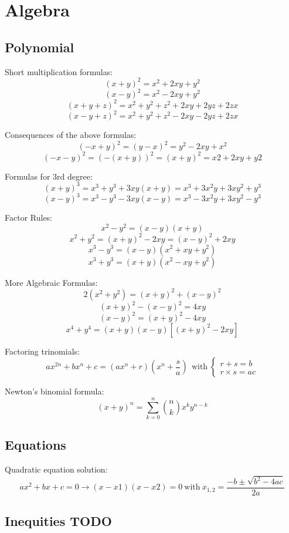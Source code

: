 \chapter{Algebra}

\section{Polynomial}
Short multiplication formulas:
$$(x + y)^2 = x^2 + 2xy + y^2$$
$$(x - y)^2 = x^2 - 2xy + y^2$$ 
$$(x + y + z)^2 = x^2 + y^2 + z^2 + 2xy + 2yz + 2zx$$ 
$$(x - y + z)^2 = x^2 + y^2 + z^2 - 2xy - 2yz + 2zx$$ 

Consequences of the above formulas:
$$(-x + y)^2 = (y - x)^2 = y^2 - 2xy + x^2$$
$$(-x - y)^2 = (-(x + y))^2 = (x + y)^2 = x2 + 2xy + y2$$

Formulas for 3rd degree:
$$(x + y)^3 = x^3 + y^3 + 3xy(x + y) = x^3 + 3x^2y + 3xy^2 + y^3$$
$$(x - y)^3 = x^3 - y^3 - 3xy(x - y) = x^3 - 3x^2y + 3xy^2 - y^3$$

Factor Rules:
$$x^2 - y^2 = (x - y)(x + y)$$
$$x^2 + y^2 = (x + y)^2 - 2xy = (x - y)^2 + 2xy$$
$$x^3 - y^3 = (x - y)(x^2 + xy + y^2)$$
$$x^3 + y^3 = (x + y)(x^2 - xy + y^2)$$

More Algebraic Formulas:
$$2(x^2 + y^2) = (x + y)^2 + (x - y)^2$$
$$(x + y)^2 - (x - y)^2 = 4xy$$
$$(x - y)^2 = (x + y)^2 - 4xy$$
$$x^4 + y^4 = (x + y)(x - y)[(x + y)^2 - 2xy]$$

Factoring trinomials:
$$ ax^{2n} + bx^n + c = (ax^n + r)(x^n + \frac{s}{a}) ~~ \text{with} ~ \begin{cases} 
                                                                  r + s = b \\
                                                                  r \times s = ac
                                                                 \end{cases}
$$

Newton's binomial formula:
\[ (x+y)^n = \sum_{k=0}^{n}\binom{n}{k}x^ky^{n-k} \]

\section{Equations}
Quadratic equation solution:
$$ ax^2 + bx + c = 0 \rightarrow (x - x1)(x - x2) = 0 ~\text{with}~ x_{1,2}=\frac{-b\pm\sqrt{b^2-4ac}}{2a}$$

\section{Inequities TODO}